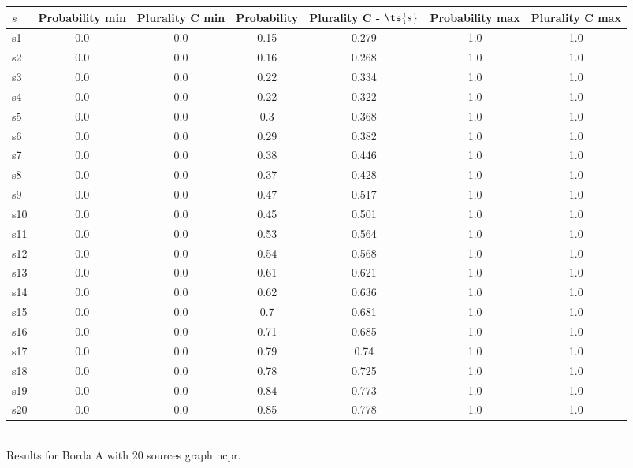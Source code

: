 \documentclass{article}
\begin{document}
\noindent\begin{tabular}{|l|c|c|c|c|c|c|}
\hline
$s$& Probability min & Plurality C min & Probability & Plurality C - $\ts{s}$ & Probability max & Plurality C max\\
\hline
s1 &0.0 & 0.0 & 0.15 & 0.279 & 1.0 & 1.0\\
\hline
s2 &0.0 & 0.0 & 0.16 & 0.268 & 1.0 & 1.0\\
\hline
s3 &0.0 & 0.0 & 0.22 & 0.334 & 1.0 & 1.0\\
\hline
s4 &0.0 & 0.0 & 0.22 & 0.322 & 1.0 & 1.0\\
\hline
s5 &0.0 & 0.0 & 0.3 & 0.368 & 1.0 & 1.0\\
\hline
s6 &0.0 & 0.0 & 0.29 & 0.382 & 1.0 & 1.0\\
\hline
s7 &0.0 & 0.0 & 0.38 & 0.446 & 1.0 & 1.0\\
\hline
s8 &0.0 & 0.0 & 0.37 & 0.428 & 1.0 & 1.0\\
\hline
s9 &0.0 & 0.0 & 0.47 & 0.517 & 1.0 & 1.0\\
\hline
s10 &0.0 & 0.0 & 0.45 & 0.501 & 1.0 & 1.0\\
\hline
s11 &0.0 & 0.0 & 0.53 & 0.564 & 1.0 & 1.0\\
\hline
s12 &0.0 & 0.0 & 0.54 & 0.568 & 1.0 & 1.0\\
\hline
s13 &0.0 & 0.0 & 0.61 & 0.621 & 1.0 & 1.0\\
\hline
s14 &0.0 & 0.0 & 0.62 & 0.636 & 1.0 & 1.0\\
\hline
s15 &0.0 & 0.0 & 0.7 & 0.681 & 1.0 & 1.0\\
\hline
s16 &0.0 & 0.0 & 0.71 & 0.685 & 1.0 & 1.0\\
\hline
s17 &0.0 & 0.0 & 0.79 & 0.74 & 1.0 & 1.0\\
\hline
s18 &0.0 & 0.0 & 0.78 & 0.725 & 1.0 & 1.0\\
\hline
s19 &0.0 & 0.0 & 0.84 & 0.773 & 1.0 & 1.0\\
\hline
s20 &0.0 & 0.0 & 0.85 & 0.778 & 1.0 & 1.0\\
\hline
\end{tabular}\\

\noindent Results for Borda A with 20 sources graph ncpr.
\end{document}
